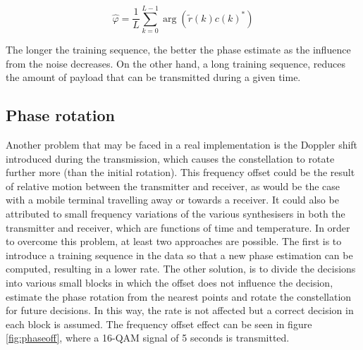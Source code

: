 \documentclass[12pt,a4paper,openright]{report}
\begin{document}
\begin{equation}
\hat \varphi  = \frac{1}{L}\sum\limits_{k=0}^{L - 1} {\arg (\tilde r(k)c(k)^*)}
\end{equation}

The longer the training sequence, the better the phase estimate as the influence from the noise decreases. On the other hand, a long training sequence, reduces the amount of payload that can be transmitted during a given time.

\subsection{Phase rotation}
\label{subsec:Phase rotation}
Another problem that may be faced in a real implementation is the Doppler shift introduced during the transmission, which causes the constellation to rotate further more (than the initial rotation). This frequency offset could be the result of relative motion between the transmitter and receiver, as would be the case with a mobile terminal travelling away or towards a receiver. It could also be attributed to small frequency variations of the various synthesisers in both the transmitter and receiver, which are functions of time and temperature. In order to overcome this problem, at least two approaches are possible. The first is to introduce a training sequence in the data so that a new phase estimation can be computed, resulting in a lower rate. The other solution, is to divide the decisions into various small blocks in which the offset does not influence the decision, estimate the phase rotation from the nearest points and rotate the constellation for future decisions. In this way, the rate is not affected but a correct decision in each block is assumed. The frequency offset effect can be seen in figure \ref{fig:phaseoff}, where a 16-QAM signal of 5 seconds is transmitted. 
\end{document}
